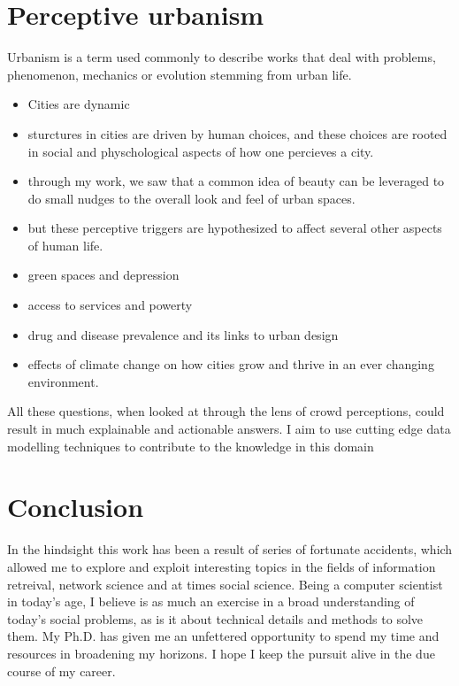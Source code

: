 \section{Perceptive urbanism}
Urbanism is a term used commonly to describe works that deal with problems, phenomenon, mechanics or evolution stemming from urban life.
\begin{itemize}
    \item Cities are dynamic
    \item sturctures in cities are driven by human choices, and these choices are rooted in social and physchological aspects of how one percieves a city.
    \item through my work, we saw that a common idea of beauty can be leveraged to do small nudges to the overall look and feel of urban spaces. 
    \item but these perceptive triggers are hypothesized to affect several other aspects of human life. 
    \item green spaces and depression
    \item access to services and powerty
    \item drug and disease prevalence and its links to urban design 
    \item effects of climate change on how cities grow and thrive in an ever changing environment. 
\end{itemize}
All these questions, when looked at through the lens of crowd perceptions, could result in much explainable and actionable answers. I aim to use cutting edge data modelling techniques to contribute to the knowledge in this domain 



\section{Conclusion}

In the hindsight this work has been a result of series of fortunate accidents, which allowed me to explore and exploit interesting topics in the fields of information retreival, network science and at times social science. Being a computer scientist in today's age, I believe is as much an exercise in a broad understanding of today's social problems, as is it about technical details and methods to solve them. My Ph.D. has given me an unfettered opportunity to spend my time and resources in broadening my horizons. I hope I keep the pursuit alive in the due course of my career. 
